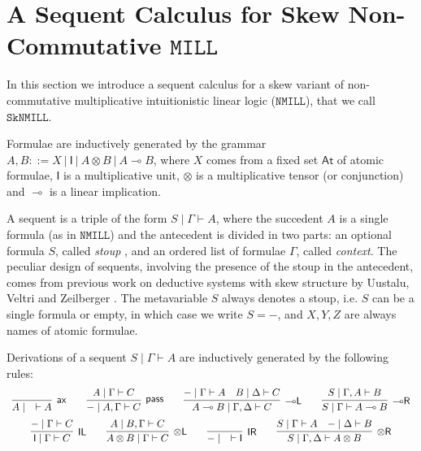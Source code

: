 \documentclass[copyright,creativecommons]{eptcs}
\theoremstyle{definition}
\newtheorem{defn}{Definition}[section]
\newcommand{\tl}{\otimes \mathsf{L}}
\newcommand{\tr}{\otimes \mathsf{R}}
\newcommand{\lright}{{\multimap}\mathsf{R}}
\newcommand{\lleft}{{\multimap}\mathsf{L}}
\newcommand{\pass}{\mathsf{pass}}
\newcommand{\unitl}{\mathsf{IL}}
\newcommand{\unitr}{\mathsf{IR}}
\newcommand{\ax}{\mathsf{ax}}
\newcommand{\ot}{\otimes}
\newcommand{\lolli}{\multimap}
\newcommand{\I}{\mathsf{I}}
\newcommand{\MILL}{$\mathtt{MILL}$}
\newcommand{\NMILL}{$\mathtt{NMILL}$}
\newcommand{\SkNMILL}{$\mathtt{SkNMILL}$}
\begin{document}
\section{A Sequent Calculus for Skew Non-Commutative \MILL}\label{sec2}
In this section we introduce a sequent calculus for a skew variant of non-commutative multiplicative intuitionistic linear logic (\NMILL), that we call \SkNMILL.

Formulae are inductively generated by the grammar $A,B ::= X \ | \ \I \ | \ A \ot B \ | \ A \lolli B$, where $X$ comes from a fixed set $\mathsf{At}$ of atomic formulae, $\I$ is a multiplicative unit, $\ot$ is a multiplicative tensor (or conjunction) and $\lolli$ is a linear implication.

A sequent is a triple of the form $S \mid \Gamma \vdash A$, where the succedent $A$ is a single formula (as in \NMILL) and the antecedent is divided in two parts: an optional formula $S$, called \emph{stoup} \cite{girard:constructive:91}, and an ordered list of formulae $\Gamma$, called \emph{context}. The peculiar design of sequents, involving the presence of the stoup in the antecedent, comes from previous work on deductive systems with skew structure by Uustalu, Veltri and Zeilberger \cite{uustalu:sequent:2021,uustalu:proof:nodate,uustalu:deductive:nodate,veltri:coherence:2021}.
The metavariable $S$ always denotes a stoup, i.e. $S$ can be a single formula or empty, in which case we write $S = -$, and $X,Y,Z$ are always names of atomic formulae.

Derivations of a sequent $S \mid \Gamma \vdash A$ are inductively generated by the following rules:
\begin{equation}\label{eq:seqcalc}
  \def\arraystretch{2.5}
  \begin{array}{c}
    \infer[\ax]{A \mid \quad \vdash A}{}
    \qquad
    \infer[\pass]{{-} \mid A , \Gamma \vdash C}{A \mid \Gamma \vdash C}
    \qquad
    \infer[\lleft]{A \lolli B \mid \Gamma , \Delta \vdash C}{
      {-} \mid \Gamma \vdash A
      &
      B \mid \Delta \vdash C
    }
    \qquad
    \infer[\lright]{S \mid \Gamma \vdash A \lolli B}{S \mid \Gamma , A \vdash B}
    \\
    \infer[\unitl]{\I \mid \Gamma \vdash C}{{-} \mid \Gamma \vdash C}
    \qquad
    \infer[\tl]{A \ot B \mid \Gamma \vdash C}{A \mid B , \Gamma \vdash C}
    \qquad
    \infer[\unitr]{{-} \mid \quad \vdash \I}{}
    \qquad
    \infer[\tr]{S \mid \Gamma , \Delta \vdash A \ot B}{
      S \mid \Gamma \vdash A
      &
      {-} \mid \Delta \vdash B
    }
  \end{array}
\end{equation}
\end{document}
